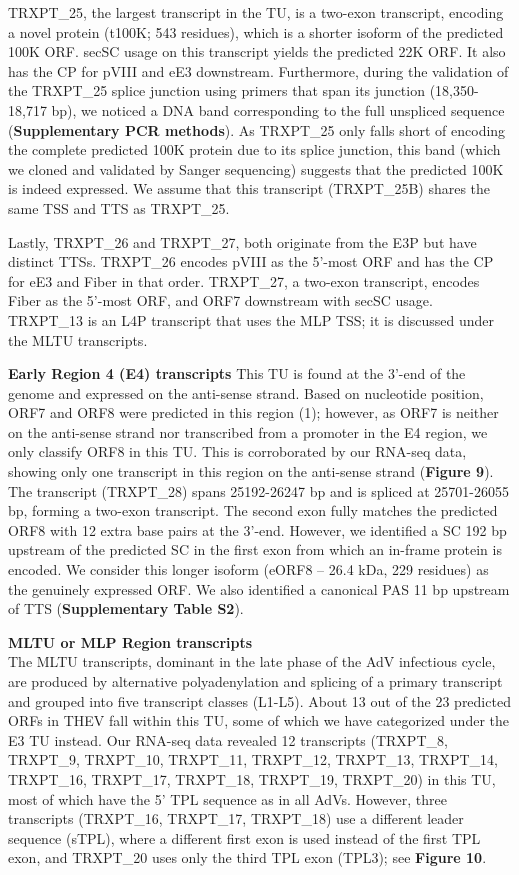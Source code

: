 \documentclass[
]{article}
\begin{document}
TRXPT\_25, the largest transcript in the TU, is a two-exon transcript,
encoding a novel protein (t100K; 543 residues), which is a shorter
isoform of the predicted 100K ORF. secSC usage on this transcript yields
the predicted 22K ORF. It also has the CP for pVIII and eE3 downstream.
Furthermore, during the validation of the TRXPT\_25 splice junction
using primers that span its junction (18,350-18,717 bp), we noticed a
DNA band corresponding to the full unspliced sequence
(\textbf{Supplementary PCR methods}). As TRXPT\_25 only falls short of
encoding the complete predicted 100K protein due to its splice junction,
this band (which we cloned and validated by Sanger sequencing) suggests
that the predicted 100K is indeed expressed. We assume that this
transcript (TRXPT\_25B) shares the same TSS and TTS as TRXPT\_25.

Lastly, TRXPT\_26 and TRXPT\_27, both originate from the E3P but have
distinct TTSs. TRXPT\_26 encodes pVIII as the 5'-most ORF and has the CP
for eE3 and Fiber in that order. TRXPT\_27, a two-exon transcript,
encodes Fiber as the 5'-most ORF, and ORF7 downstream with secSC usage.
TRXPT\_13 is an L4P transcript that uses the MLP TSS; it is discussed
under the MLTU transcripts.

\textbf{Early Region 4 (E4) transcripts} This TU is found at the 3'-end
of the genome and expressed on the anti-sense strand. Based on
nucleotide position, ORF7 and ORF8 were predicted in this region (1);
however, as ORF7 is neither on the anti-sense strand nor transcribed
from a promoter in the E4 region, we only classify ORF8 in this TU. This
is corroborated by our RNA-seq data, showing only one transcript in this
region on the anti-sense strand (\textbf{Figure 9}). The transcript
(TRXPT\_28) spans 25192-26247 bp and is spliced at 25701-26055 bp,
forming a two-exon transcript. The second exon fully matches the
predicted ORF8 with 12 extra base pairs at the 3'-end. However, we
identified a SC 192 bp upstream of the predicted SC in the first exon
from which an in-frame protein is encoded. We consider this longer
isoform (eORF8 -- 26.4 kDa, 229 residues) as the genuinely expressed
ORF. We also identified a canonical PAS 11 bp upstream of TTS
(\textbf{Supplementary Table S2}).

\textbf{MLTU or MLP Region transcripts}\\
The MLTU transcripts, dominant in the late phase of the AdV infectious
cycle, are produced by alternative polyadenylation and splicing of a
primary transcript and grouped into five transcript classes (L1-L5).
About 13 out of the 23 predicted ORFs in THEV fall within this TU, some
of which we have categorized under the E3 TU instead. Our RNA-seq data
revealed 12 transcripts (TRXPT\_8, TRXPT\_9, TRXPT\_10, TRXPT\_11,
TRXPT\_12, TRXPT\_13, TRXPT\_14, TRXPT\_16, TRXPT\_17, TRXPT\_18,
TRXPT\_19, TRXPT\_20) in this TU, most of which have the 5' TPL sequence
as in all AdVs. However, three transcripts (TRXPT\_16, TRXPT\_17,
TRXPT\_18) use a different leader sequence (sTPL), where a different
first exon is used instead of the first TPL exon, and TRXPT\_20 uses
only the third TPL exon (TPL3); see \textbf{Figure 10}.
\end{document}
